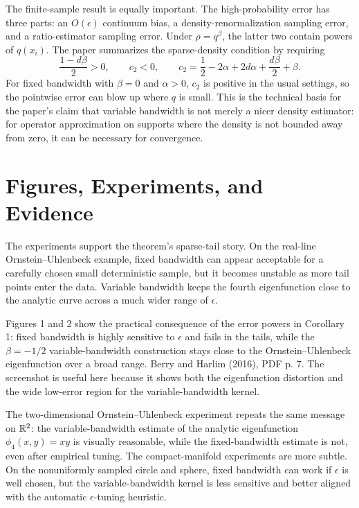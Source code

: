 \documentclass[11pt]{article}
\begin{document}
The finite-sample result is equally important.  The high-probability error has
three parts: an \(O(\epsilon)\) continuum bias, a density-renormalization
sampling error, and a ratio-estimator sampling error.  Under
\(\rho=q^\beta\), the latter two contain powers of \(q(x_i)\).  The paper
summarizes the sparse-density condition by requiring
\[
  \frac{1-d\beta}{2}>0,
  \qquad
  c_2 < 0,
  \qquad
  c_2=\frac12-2\alpha+2d\alpha+\frac{d\beta}{2}+\beta.
\]
For fixed bandwidth with \(\beta=0\) and \(\alpha>0\), \(c_2\) is positive in
the usual settings, so the pointwise error can blow up where \(q\) is small.
This is the technical basis for the paper's claim that variable bandwidth is
not merely a nicer density estimator: for operator approximation on supports
where the density is not bounded away from zero, it can be necessary for
convergence.

\section{Figures, Experiments, and Evidence}

The experiments support the theorem's sparse-tail story.  On the real-line
Ornstein--Uhlenbeck example, fixed bandwidth can appear acceptable for a
carefully chosen small deterministic sample, but it becomes unstable as more
tail points enter the data.  Variable bandwidth keeps the fourth eigenfunction
close to the analytic curve across a much wider range of \(\epsilon\).

{Figures 1 and 2 show the practical consequence of the error powers in
Corollary 1: fixed bandwidth is highly sensitive to \(\epsilon\) and fails in
the tails, while the \(\beta=-1/2\) variable-bandwidth construction stays close
to the Ornstein--Uhlenbeck eigenfunction over a broad range.}
{Berry and Harlim (2016), PDF p. 7.}
{The screenshot is useful here because it shows both the eigenfunction
distortion and the wide low-error region for the variable-bandwidth kernel.}

The two-dimensional Ornstein--Uhlenbeck experiment repeats the same message on
\(\mathbb{R}^2\): the variable-bandwidth estimate of the analytic eigenfunction
\(\phi_4(x,y)=xy\) is visually reasonable, while the fixed-bandwidth estimate
is not, even after empirical tuning.  The compact-manifold experiments are more
subtle.  On the nonuniformly sampled circle and sphere, fixed bandwidth can
work if \(\epsilon\) is well chosen, but the variable-bandwidth kernel is less
sensitive and better aligned with the automatic \(\epsilon\)-tuning heuristic.
\end{document}
